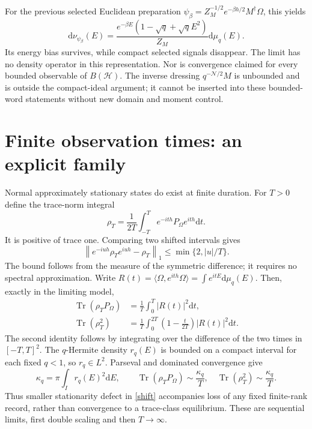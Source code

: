 \documentclass[11pt]{article}
\newcommand{\HH}{\mathcal H}
\newcommand{\Tr}{\operatorname{Tr}}
\newcommand{\dd}{\mathrm d}
\newcommand{\norm}[1]{\left\lVert#1\right\rVert}
\begin{document}
For the previous selected Euclidean preparation
$\psi_\beta=Z_M^{-1/2}e^{-\beta h/2}M^\dagger\Omega$, this yields
\begin{equation}
 \dd\nu_{\psi_\beta}(E)=
 \frac{e^{-\beta E}(1-\sqrt q+\sqrt q E^2)}{Z_M}\dd\mu_q(E).
\end{equation}
Its energy bias survives, while compact selected signals disappear.
The limit has no density operator in this representation. Nor is
convergence claimed for every bounded observable of $B(\HH)$.
The inverse dressing $q^{-\mathcal N/2}M$ is unbounded and is
outside the compact-ideal argument; it cannot be inserted into
these bounded-word statements without new domain and moment control.

\newpage
\section{Finite observation times: an explicit family}
Normal approximately stationary states do exist at finite duration.
For $T>0$ define the trace-norm integral
\begin{equation}
 \rho_T=\frac1{2T}\int_{-T}^T
          e^{-ith}P_\Omega e^{ith}\dd t.
\end{equation}
It is positive of trace one. Comparing two shifted intervals gives
\begin{equation}\label{shift}
 \norm{e^{-iuh}\rho_Te^{iuh}-\rho_T}_1
 \le\min\{2,|u|/T\}.
\end{equation}
The bound follows from the measure of the symmetric difference;
it requires no spectral approximation. Write
$R(t)=\langle\Omega,e^{ith}\Omega\rangle=\int e^{itE}\dd\mu_q(E)$.
Then, exactly in the limiting model,
\begin{align}
 \Tr(\rho_TP_\Omega)&=\frac1T\int_0^T |R(t)|^2\dd t,\label{signal}\\
 \Tr(\rho_T^2)&=\frac1T\int_0^{2T}
                \left(1-\frac{t}{2T}\right)|R(t)|^2\dd t.\label{purity}
\end{align}
The second identity follows by integrating over the difference of
the two times in $[-T,T]^2$. The $q$-Hermite density $r_q(E)$
is bounded on a compact interval for each fixed $q<1$, so
$r_q\in L^2$. Parseval and dominated convergence give
\begin{equation}\label{kappa}
 \kappa_q=\pi\int_I r_q(E)^2\dd E,\qquad
 \Tr(\rho_TP_\Omega)\sim\frac{\kappa_q}{T},\quad
 \Tr(\rho_T^2)\sim\frac{\kappa_q}{T}.
\end{equation}
Thus smaller stationarity defect in \eqref{shift} accompanies
loss of any fixed finite-rank record, rather than convergence to
a trace-class equilibrium. These are sequential limits, first
double scaling and then $T\to\infty$.
\end{document}
